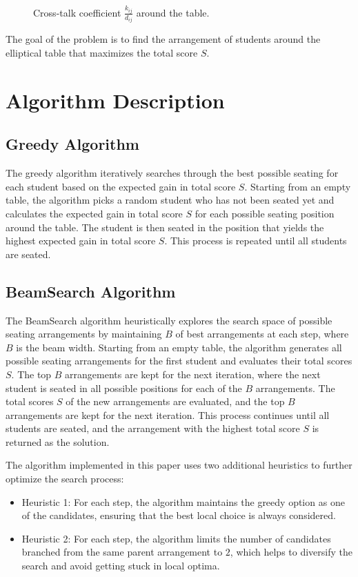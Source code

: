 \documentclass[11pt]{article}
\begin{document}
\begin{figure}[H]
    \centering
    \scalebox{0.5}{}
    \caption{Cross-talk coefficient $\tfrac{k_{ij}}{d_{ij}}$ around the table.}
    \label{fig:cross_talk}
\end{figure}

The goal of the problem is to find the arrangement of students around the elliptical table that maximizes the total score $S$.

\section{Algorithm Description}

\subsection{Greedy Algorithm}

The greedy algorithm iteratively searches through the best possible seating for each student based on the expected gain in total score $S$.
Starting from an empty table, the algorithm picks a random student who has not been seated yet and calculates the expected gain in total score $S$ for each possible seating position around the table.
The student is then seated in the position that yields the highest expected gain in total score $S$.
This process is repeated until all students are seated.

\subsection{BeamSearch Algorithm}

The BeamSearch algorithm heuristically explores the search space of possible seating arrangements by maintaining $B$ of best arrangements at each step, where $B$ is the beam width.
Starting from an empty table, the algorithm generates all possible seating arrangements for the first student and evaluates their total scores $S$.
The top $B$ arrangements are kept for the next iteration, where the next student is seated in all possible positions for each of the $B$ arrangements.
The total scores $S$ of the new arrangements are evaluated, and the top $B$ arrangements are kept for the next iteration.
This process continues until all students are seated, and the arrangement with the highest total score $S$ is returned as the solution.

The algorithm implemented in this paper uses two additional heuristics to further optimize the search process:
\begin{itemize}
    \item Heuristic 1: For each step, the algorithm maintains the greedy option as one of the candidates, ensuring that the best local choice is always considered.
    \item Heuristic 2: For each step, the algorithm limits the number of candidates branched from the same parent arrangement to $2$, which helps to diversify the search and avoid getting stuck in local optima.
\end{itemize}
\end{document}
